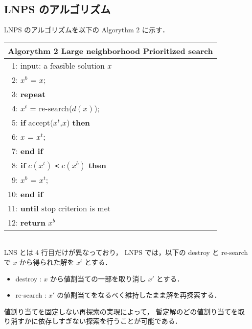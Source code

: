\subsection{LNPS のアルゴリズム}
LNPS のアルゴリズムを以下の Algorythm 2 に示す．
\begin{table}[htb]
\begin{tabular}{l}\hline
\textbf{Algorythm 2} Large neighborhood Prioritized search 
\cite{%
 hayama19:kobe}\\ \hline
 ~1: input: a feasible solution $x$ \\
 ~2: $x^b$ = $x$; \\
 ~3: \bf{repeat} \\
 ~4: \quad \quad $x^t$ = re-search($d(x)$); \\
 ~5: \quad \quad \textbf{if} accept($x^t$,$x$) \textbf{then} \\
 ~6: \quad \quad \quad \quad $x$ = $x^t$; \\
 ~7: \quad \quad \textbf{end if} \\
 ~8: \quad \quad \textbf{if} $c(x^t)$ \verb|<| $c(x^b)$ \textbf{then} \\
 ~9: \quad \quad \quad \quad $x^b$ = $x^t$; \\
10: \quad \quad \textbf{end if} \\
11: \textbf{until} stop criterion is met \\
12: \textbf{return} $x^b$ \\ \hline
\end{tabular}
\end{table}\\
LNS とは 4 行目だけが異なっており，
LNPS では，以下の destroy と re-search で $x$ から得られた解を $x^t$ とする．
\begin{itemize}
\item destroy : $x$ から値割当ての一部を取り消し $x′$ とする．
\item re-search : $x′$ の値割当てをなるべく維持したまま解を再探索する．
\end{itemize}

値割り当てを固定しない再探索の実現によって，
暫定解のどの値割り当てを取り消すかに依存しすぎない探索を行うことが可能である．
